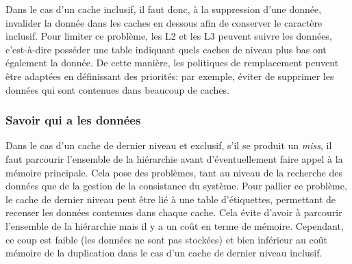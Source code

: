 Dans le cas d'un cache inclusif, il faut donc, à la suppression d'une donnée, invalider la donnée dans les caches en dessous afin de conserver le caractère inclusif. Pour limiter ce problème, les L2 et les L3 peuvent suivre les données, c'est-à-dire posséder une table indiquant quels caches de niveau plus bas ont également la donnée. De cette manière, les politiques de remplacement peuvent être adaptées en définissant des priorités: par exemple, éviter de supprimer les données qui sont contenues dans beaucoup de caches.

\subsubsection{Savoir qui a les données}
Dans le cas d'un cache de dernier niveau et exclusif, s'il se produit un \textit{miss}, il faut parcourir l'ensemble de la hiérarchie avant d'éventuellement faire appel à la mémoire principale. Cela pose des problèmes, tant au niveau de la recherche des données que de la gestion de la consistance du système. Pour pallier ce problème, le cache de dernier niveau peut être lié à une table d'étiquettes, permettant de recenser les données contenues dans chaque cache. Cela évite d'avoir à parcourir l'ensemble de la hiérarchie mais il y a un coût en terme de mémoire. Cependant, ce coup est faible (les données ne sont pas stockées) et bien inférieur au coût mémoire de la duplication dans le cas d'un cache de dernier niveau inclusif.
